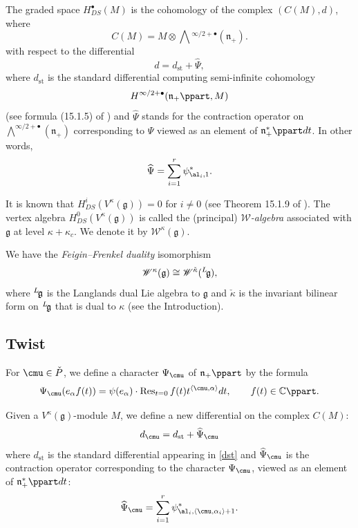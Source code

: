 \documentclass{amsart}
\newcommand{\wh}{\widehat}
\newcommand{\bra}{{\langle}}
\newcommand{\ket}{{\rangle}}
\newcommand{\on}{\operatorname}
\newcommand{\+}{\mathop{\oplus}}
\renewcommand{\*}{{\otimes}}
\newcommand{\mc}{\mathcal}
\newcommand{\mf}{\mathfrak}
\newcommand{\g}{\mf{g}}
\newcommand{\C}{\mathbb{C}}
\newcommand{\W}{\mathscr{W}}
\def\neg{\negthinspace}
\def\lg{{}^L\neg\g}
\theoremstyle{theorem}
\theoremstyle{remark}
\numberwithin{equation}{section}
\begin{document}
The graded space $H_{DS}^\bullet(M)$ is the cohomology of the complex
$(C(M),d)$, where
$$
C(M)=M\otimes \bigwedge{}^{\infty/2+\bullet}(\mf{n}_+).
$$
with respect to the differential
\begin{equation}    \label{dst}
d=d_{\on{st}}+\wh\Psi,
\end{equation}
where $d_{\on{st}}$ is the standard differential computing
semi-infinite cohomology
$$
H^{\infty/2+\bullet}(\mf{n}_+\ppart, M)
$$
(see formula (15.1.5) of \cite{FreBen04}) and $\wh\Psi$ stands for the
contraction operator on $\bigwedge^{\infty/2+\bullet}(\mf{n}_+)$
corresponding to $\Psi$ viewed as an element of $\mf{n}_+^*\ppart
dt$. In other words,
$$
\wh\Psi = \sum_{i=1}^r \psi^*_{\al_i,1}.
$$

It is known that $H_{DS}^i(V^\kappa(\g)) = 0$ for $i \neq 0$ (see
Theorem 15.1.9 of \cite{FreBen04}). The vertex algebra
$H_{DS}^0(V^\kappa(\g))$ is called the (principal) {\em ${\mc
    W}$-algebra} associated with $\g$ at level $\kappa+\kappa_c$. We
denote it by $\W^\kappa(\g)$.

We have the {\em Feigin--Frenkel duality} isomorphism
\cite{FeiFre91,FF}
\begin{align}
\W^\kappa(\g)\cong \W^{\check{\kappa}}(\lg),
\label{eq:FF-duality}
\end{align}
where $\lg$ is the Langlands dual Lie algebra to $\g$ and
$\check{\kappa}$ is the invariant bilinear form on $\lg$ that is dual
to $\kappa$ (see the Introduction).

\subsection{Twist}    \label{twist}

For $\cmu \in \check{P}$, we define a character $\Psi_\cmu$ of
$\mf{n}_+\ppart$ by the formula
\begin{equation}    \label{Psimu}
\Psi_\cmu(e_\alpha f(t)) = \psi(e_{\alpha}) \cdot \on{Res}_{t=0} f(t)
t^{\bra \cmu,\alpha \ket} dt, \qquad f(t) \in \C\ppart.
\end{equation}

Given a $V^\kappa(\g)$-module $M$, we define a new differential on the
complex $C(M)$:
\begin{equation}    \label{dmu}
d_\cmu = d_{\on{st}} + \wh\Psi_\cmu
\end{equation}
where $d_{\on{st}}$ is the standard differential appearing in
\eqref{dst} and $\wh\Psi_\cmu$ is the contraction operator
corresponding to the character $\Psi_\cmu$, viewed as an element
of $\mf{n}_+^*\ppart dt$:
$$
\wh\Psi_\cmu = \sum_{i=1}^r \psi^*_{\al_i,\bra \cmu,\alpha_i \ket+1}.
$$
\end{document}
